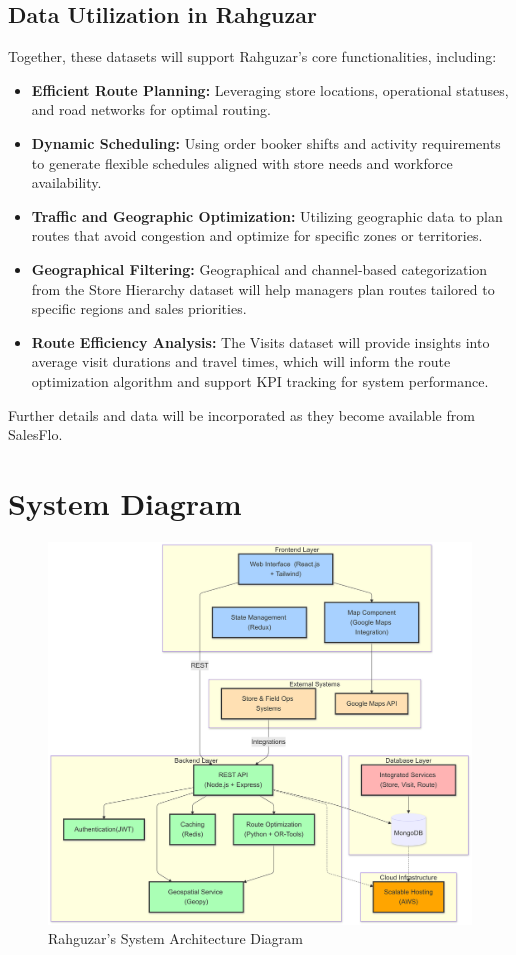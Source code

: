 \subsection*{Data Utilization in Rahguzar}

Together, these datasets will support Rahguzar’s core functionalities, including:
\begin{itemize}
    \item \textbf{Efficient Route Planning:} Leveraging store locations, operational statuses, and road networks for optimal routing.
    \item \textbf{Dynamic Scheduling:} Using order booker shifts and activity requirements to generate flexible schedules aligned with store needs and workforce availability.
    \item \textbf{Traffic and Geographic Optimization:} Utilizing geographic data to plan routes that avoid congestion and optimize for specific zones or territories.
    \item \textbf{Geographical Filtering:} Geographical and channel-based categorization from the Store Hierarchy dataset will help managers plan routes tailored to specific regions and sales priorities.
    \item \textbf{Route Efficiency Analysis:} The Visits dataset will provide insights into average visit durations and travel times, which will inform the route optimization algorithm and support KPI tracking for system performance.
\end{itemize}

Further details and data will be incorporated as they become available from SalesFlo.

\section{System Diagram}
\begin{center}
        \begin{figure}[H]
        \centering
        \includegraphics[width=\textwidth]{images/Rahguzar - High Level System Diagram.png} 
        \caption{Rahguzar's System Architecture Diagram}
    \end{figure}
\end{center}